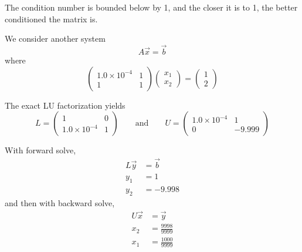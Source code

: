 The condition number is bounded below by 1, and the closer it is to 1, the better conditioned the matrix is.

\begin{example}
    We consider another system \[
        A \vec{x} = \vec{b}
    \] where \[
        \begin{pmatrix}
            1.0 \times 10^{-4} & 1 \\ 1 & 1
        \end{pmatrix}
        \begin{pmatrix}
            x_1 \\ x_2
        \end{pmatrix}
        =
        \begin{pmatrix}
            1 \\ 2
        \end{pmatrix}
    \]

    The exact LU factorization yields \[
        L = \begin{pmatrix}
            1 & 0 \\ 1.0 \times 10^{-4} & 1
        \end{pmatrix}
        \qquad \text{and} \qquad
        U = \begin{pmatrix}
            1.0 \times 10^{-4} & 1 \\ 0 & -9.999
        \end{pmatrix}
    \]

    With forward solve,
    \begin{align*}
        L\vec{y} & = \vec{b} \\
        y_1      & = 1       \\
        y_2      & = -9.998
    \end{align*}
    and then with backward solve,
    \begin{align*}
        U\vec{x} & = \vec{y}           \\
        x_2      & = \frac{9998}{9999} \\
        x_1      & = \frac{1000}{9999}
    \end{align*}


\end{example}
